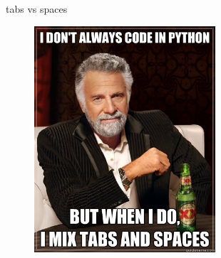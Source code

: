 \documentclass[10pt]{beamer}
\begin{document}
\begin{frame}{tabs vs spaces}
\begin{figure}
 	\includegraphics[width=0.6\textwidth]{figs/tabsVSpaces.jpg}
\end{figure}
\end{frame}


%
%
\end{document}
